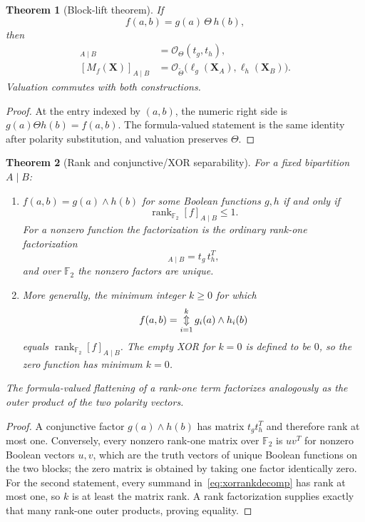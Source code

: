 \documentclass[11pt]{article}
\newtheorem{theorem}{Theorem}[section]
\theoremstyle{definition}
\theoremstyle{remark}
\newcommand{\F}{\mathbb F}
\newcommand{\cO}{\mathcal O}
\newcommand{\bigxor}{\mathop{\Updownarrow}\displaylimits}
\begin{document}
\begin{theorem}[Block-lift theorem]
If
\[
 f(a,b)=g(a)\,\Theta\,h(b),
\]
then
\begin{align}
 [f]_{A\mid B}&=\cO_\Theta(t_g,t_h),
 \label{eq:blocklift}\\
 [M_f(\mathbf X)]_{A\mid B}&=\cO_{\widetilde\Theta}\bigl(\ell_g(\mathbf X_A),\ell_h(\mathbf X_B)\bigr).
 \label{eq:symbolicblocklift}
\end{align}
Valuation commutes with both constructions.
\end{theorem}
\begin{proof}
At the entry indexed by $(a,b)$, the numeric right side is $g(a)\Theta h(b)=f(a,b)$.  The formula-valued statement is the same identity after polarity substitution, and valuation preserves $\Theta$.
\end{proof}

\begin{theorem}[Rank and conjunctive/XOR separability]
For a fixed bipartition $A\mid B$:
\begin{enumerate}
\item $f(a,b)=g(a)\land h(b)$ for some Boolean functions $g,h$ if and only if
\[
 \operatorname{rank}_{\F_2}[f]_{A\mid B}\le 1.
\]
For a nonzero function the factorization is the ordinary rank-one factorization
\begin{equation}
 [f]_{A\mid B}=t_g\,t_h^T,
 \label{eq:separable}
\end{equation}
and over $\F_2$ the nonzero factors are unique.
\item More generally, the minimum integer $k\ge0$ for which
\begin{equation}
 f(a,b)=\bigxor_{i=1}^{k} g_i(a)\land h_i(b)
 \label{eq:xorrankdecomp}
\end{equation}
equals $\operatorname{rank}_{\F_2}[f]_{A\mid B}$.  The empty XOR for $k=0$ is defined to be $0$, so the zero function has minimum $k=0$.
\end{enumerate}
The formula-valued flattening of a rank-one term factorizes analogously as the outer product of the two polarity vectors.
\end{theorem}
\begin{proof}
A conjunctive factor $g(a)\land h(b)$ has matrix $t_g t_h^T$ and therefore rank at most one.  Conversely, every nonzero rank-one matrix over $\F_2$ is $uv^T$ for nonzero Boolean vectors $u,v$, which are the truth vectors of unique Boolean functions on the two blocks; the zero matrix is obtained by taking one factor identically zero.  For the second statement, every summand in~\eqref{eq:xorrankdecomp} has rank at most one, so $k$ is at least the matrix rank.  A rank factorization supplies exactly that many rank-one outer products, proving equality.
\end{proof}
\end{document}

